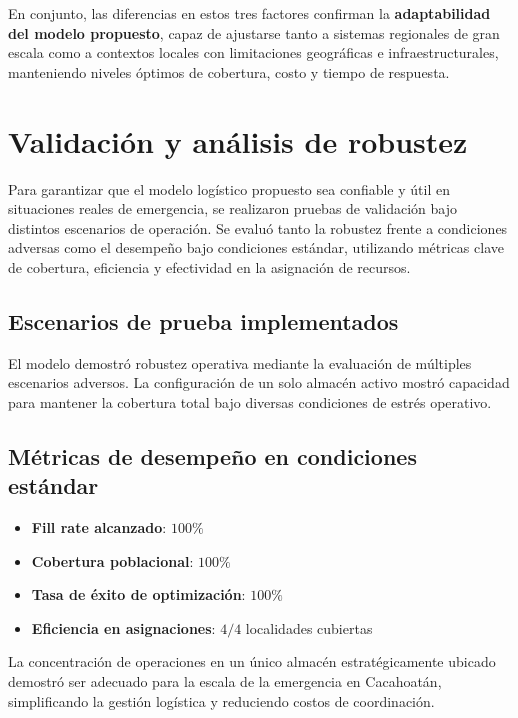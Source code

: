 \documentclass[
  spanish,
  us-letterpaper,
  DIV=11,
  numbers=noendperiod]{scrreprt}
\providecommand{\tightlist}{%
  \setlength{\itemsep}{0pt}\setlength{\parskip}{0pt}}
\numberwithin{equation}{section}
\begin{document}
En conjunto, las diferencias en estos tres factores confirman la
\textbf{adaptabilidad del modelo propuesto}, capaz de ajustarse tanto a
sistemas regionales de gran escala como a contextos locales con
limitaciones geográficas e infraestructurales, manteniendo niveles
óptimos de cobertura, costo y tiempo de respuesta.

\section{Validación y análisis de
robustez}\label{validaciuxf3n-y-anuxe1lisis-de-robustez}

Para garantizar que el modelo logístico propuesto sea confiable y útil
en situaciones reales de emergencia, se realizaron pruebas de validación
bajo distintos escenarios de operación. Se evaluó tanto la robustez
frente a condiciones adversas como el desempeño bajo condiciones
estándar, utilizando métricas clave de cobertura, eficiencia y
efectividad en la asignación de recursos.

\subsection{Escenarios de prueba
implementados}\label{escenarios-de-prueba-implementados}

El modelo demostró robustez operativa mediante la evaluación de
múltiples escenarios adversos. La configuración de un solo almacén
activo mostró capacidad para mantener la cobertura total bajo diversas
condiciones de estrés operativo.

\subsection{Métricas de desempeño en condiciones
estándar}\label{muxe9tricas-de-desempeuxf1o-en-condiciones-estuxe1ndar}

\begin{itemize}
\tightlist
\item
  \textbf{Fill rate alcanzado}: \(100\%\)
\item
  \textbf{Cobertura poblacional}: \(100\%\)
\item
  \textbf{Tasa de éxito de optimización}: \(100\%\)
\item
  \textbf{Eficiencia en asignaciones}: \(4/4\) localidades cubiertas
\end{itemize}

La concentración de operaciones en un único almacén estratégicamente
ubicado demostró ser adecuado para la escala de la emergencia en
Cacahoatán, simplificando la gestión logística y reduciendo costos de
coordinación.
\end{document}
